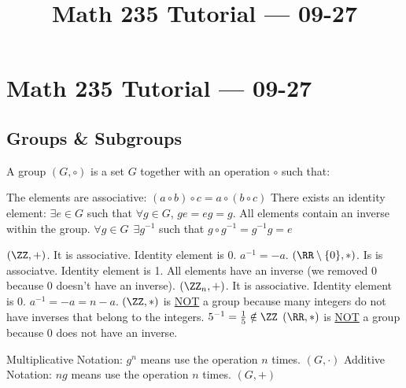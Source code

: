 \documentclass[class=scrartcl, crop=false]{standalone}
\title{Math 235 Tutorial --- 09-27}
\begin{document}
\section{Math 235 Tutorial --- 09-27}

\subsection{Groups \& Subgroups}

\begin{definition}
  A group $(G, \circ)$ is a set $G$ together with an operation $\circ$ such that:
  \begin{enumerate}
    \ii The elements are associative:
    $(a \circ b) \circ c = a \circ (b \circ c)$
    \ii There exists an identity element:
    $\exists e \in G$ such that $\forall g \in G$, $ge = eg = g$.
    \ii All elements contain an inverse within the group.
    $\forall g \in G \ \ \exists g^{-1}$ such that $g \circ g^{-1} = g^{-1} g = e$
  \end{enumerate}
\end{definition}

\begin{example}
  \begin{enumerate}
    \ii[]
    \ii
    $(\ZZ, +)$. It is associative. Identity element is 0. $a^{-1} = -a$.
    \ii
    $(\RR \setminus \{0\}, *)$. Is is associatve. Identity element is 1. All elements have an inverse (we removed 0 because 0 doesn't have an inverse).
    \ii
    $(\ZZ_n, +)$. It is associative. Identity element is 0. $a^{-1} = -a = n - a$.
    \ii
    $(\ZZ, *)$ is \ul{NOT} a group because many integers do not have inverses that belong to the integers. $5^{-1} = \frac{1}{5} \notin \ZZ$
    \ii
    $(\RR, *)$ is \ul{NOT} a group because 0 does not have an inverse.
  \end{enumerate}
\end{example}

\begin{note}
  \begin{enumerate}
    \ii[]
    \ii Multiplicative Notation: $g^n$ means use the operation $n$ times. $(G, \cdot)$ 
    \ii
    Additive Notation: $ng$ means use the operation $n$ times. $(G, +)$
  \end{enumerate}
\end{note}
\end{document}

